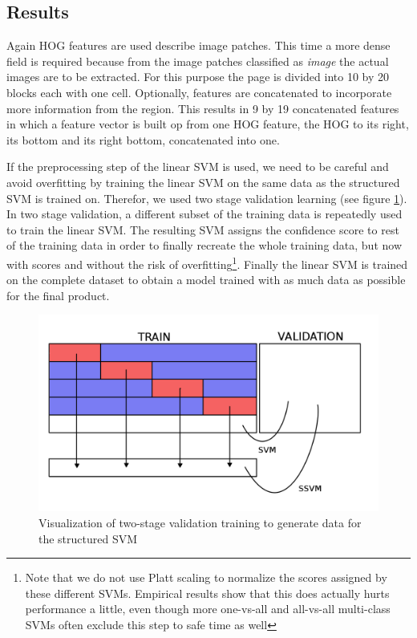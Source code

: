 \subsection{Results}
\label{subsec:imagelocresults}

Again HOG features are used describe image patches. This time a more dense field
is required because from the image patches classified as \emph{image} the actual
images are to be extracted. For this purpose the page is divided into 10 by 20
blocks each with one cell. Optionally, features are concatenated to incorporate
more information from the region. This results in 9 by 19 concatenated
features in which a feature vector is built op from one HOG feature, the HOG to
its right, its bottom and its right bottom, concatenated into one.

If the preprocessing step of the linear SVM is used, we need to be careful and
avoid overfitting by training the linear SVM on the same data as the structured
SVM is trained on. Therefor, we used two stage validation learning (see figure
\ref{fig:twostage}). In two stage validation, a different subset of
the training data is repeatedly used to train the linear SVM. The resulting SVM
assigns the
confidence score to rest of the training data in order to finally recreate the
whole training data, but now with scores and without the risk of
overfitting\footnote{Note that we do not use Platt scaling to normalize the
scores assigned by these different SVMs. Empirical results show that this does
actually hurts performance a little, even though more one-vs-all and all-vs-all
multi-class SVMs often exclude this step to safe time as well\cite{duan2005best}}.
Finally the linear SVM is trained on the complete dataset to obtain a model
trained with as much data as possible for the final product.

\begin{figure}
\includegraphics[width=.5\textwidth]{resources/twostage}
\caption{Visualization of two-stage validation training to generate data for the
structured SVM}
\label{fig:twostage}
\end{figure}

